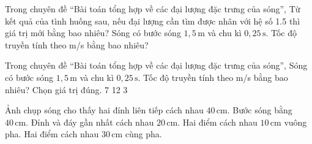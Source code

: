 \begin{ex}
Trong chuyên đề “Bài toán tổng hợp về các đại lượng đặc trưng của sóng”, Từ kết quả của tình huống sau, nếu đại lượng cần tìm được nhân với hệ số 1.5 thì giá trị mới bằng bao nhiêu? Sóng có bước sóng $1,5\,\text{m}$ và chu kì $0,25\,\text{s}$. Tốc độ truyền tính theo m/s bằng bao nhiêu?
\end{ex}

\begin{ex}
Trong chuyên đề “Bài toán tổng hợp về các đại lượng đặc trưng của sóng”, Sóng có bước sóng $1,5\,\text{m}$ và chu kì $0,25\,\text{s}$. Tốc độ truyền tính theo m/s bằng bao nhiêu? Chọn giá trị đúng.
\choice
{7}
{}
{12}
{3}
\end{ex}

\begin{ex}
Ảnh chụp sóng cho thấy hai đỉnh liên tiếp cách nhau $40\,\text{cm}$.
\choiceTF
{\True Bước sóng bằng $40\,\text{cm}$.}
{\True Đỉnh và đáy gần nhất cách nhau $20\,\text{cm}$.}
{\True Hai điểm cách nhau $10\,\text{cm}$ vuông pha.}
{Hai điểm cách nhau $30\,\text{cm}$ cùng pha.}
\end{ex}


